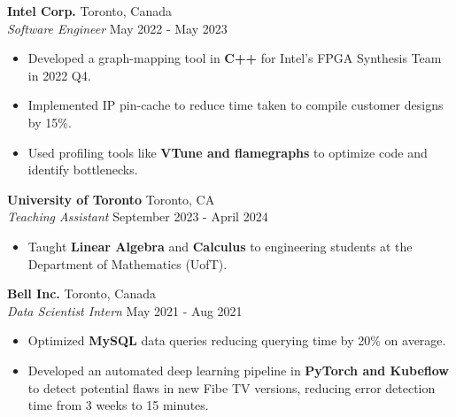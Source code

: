 \documentclass[a4paper]{article}
\begin{document}
\textbf{Intel Corp.} \hfill Toronto, Canada\\
\textit{Software Engineer} \hfill May 2022 - May 2023\\
\vspace{-2.5mm}
\begin{itemize} \itemsep 1pt
	\item Developed a graph-mapping tool in \textbf{C++} for Intel's FPGA Synthesis Team in 2022 Q4.
	\vspace{-1.5mm}
	\item Implemented IP pin-cache to reduce time taken to compile customer designs by 15\%.
	\vspace{-1.5mm}
	\item Used profiling tools like \textbf{VTune and flamegraphs} to optimize code and identify bottlenecks. 
	\vspace{-1.5mm}
\end{itemize}


\textbf{University of Toronto} \hfill Toronto, CA\\
\textit{Teaching Assistant} \hfill September 2023 - April 2024\\
\vspace{-2.5mm}
\begin{itemize} \itemsep 0.5pt
	\item Taught \textbf{Linear Algebra} and \textbf{Calculus} to engineering students at the Department of Mathematics (UofT).
    \vspace{-2mm}
\end{itemize}

\textbf{Bell Inc.} \hfill Toronto, Canada\\
\textit{Data Scientist Intern} \hfill May 2021 - Aug 2021\\
\vspace{-2.5mm}
\begin{itemize} \itemsep 1pt
	\item Optimized \textbf{MySQL} data queries reducing querying time by 20\% on average.
	\vspace{-1.5mm}
	\item Developed an automated deep learning pipeline in \textbf{PyTorch and Kubeflow} to detect potential flaws in new Fibe TV versions, reducing error detection time from 3 weeks to 15 minutes.
    \vspace{-1.5mm}
\end{itemize}
\end{document}
